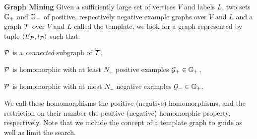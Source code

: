 \begin{definition} \textbf{Graph Mining}
\label{def:gm2}
Given a sufficiently large set of vertices $V$ and labels $L$, two sets $\mathbb{G}_{+}$ and $\mathbb{G}_{-}$ of positive, respectively negative example graphs over $V$ and $L$ and a graph $\mathcal{T}$ over $V$ and $L$ called the template,
we look for a 
graph  represented by tuple $\langle E_{\mathcal{P}}, l_{\mathcal{P}} \rangle$ such that:
\vspace{0.5em}
\begin{compactitem}
\item $\mathcal{P}$ is a \emph{connected} subgraph of $\mathcal{T}$,
\item $\mathcal{P}$ is homomorphic with at least $N_{+}$ positive examples
$\mathcal{G}_{+} \in \mathbb{G}_{+}$,
\item $\mathcal{P}$ is homomorphic with at most $N_{-}$ negative examples $\mathcal{G}_{-} \in \mathbb{G}_{+}$.
\end{compactitem}
\end{definition}
We call these homomorphisms the positive (negative) homomorphisms, and the restriction on their number the positive (negative) homomorphic property, respectively. 
Note that we include the concept of a template graph to guide as well as limit the search.

